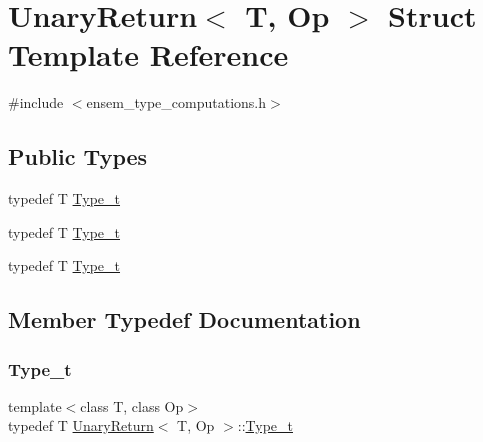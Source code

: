 \hypertarget{structUnaryReturn}{}\section{Unary\+Return$<$ T, Op $>$ Struct Template Reference}
\label{structUnaryReturn}


{\ttfamily \#include $<$ensem\+\_\+type\+\_\+computations.\+h$>$}

\subsection*{Public Types}
\begin{DoxyCompactItemize}
\item 
typedef T \mbox{\hyperlink{structUnaryReturn_afbc19933d7ee2962cbb363213d46dee0}{Type\+\_\+t}}
\item 
typedef T \mbox{\hyperlink{structUnaryReturn_afbc19933d7ee2962cbb363213d46dee0}{Type\+\_\+t}}
\item 
typedef T \mbox{\hyperlink{structUnaryReturn_afbc19933d7ee2962cbb363213d46dee0}{Type\+\_\+t}}
\end{DoxyCompactItemize}


\subsection{Member Typedef Documentation}
\mbox{\label{structUnaryReturn_afbc19933d7ee2962cbb363213d46dee0}} 
\subsubsection{\texorpdfstring{Type\_t}{Type\_t}\hspace{0.1cm}{\footnotesize\ttfamily [1/3]}}
{\footnotesize\ttfamily template$<$class T, class Op$>$ \\
typedef T \mbox{\hyperlink{structUnaryReturn}{Unary\+Return}}$<$ T, Op $>$\+::\mbox{\hyperlink{structUnaryReturn_afbc19933d7ee2962cbb363213d46dee0}{Type\+\_\+t}}}

\mbox{\label{structUnaryReturn_afbc19933d7ee2962cbb363213d46dee0}} 
